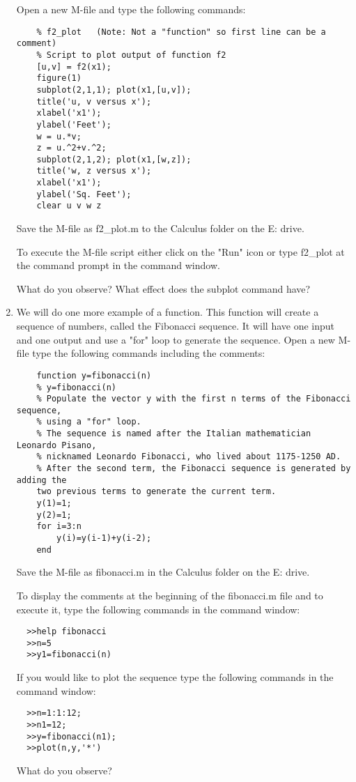 \begin{enumerate}
  Open a new M-file and type the following commands:
  \begin{verbatim}
    % f2_plot	(Note: Not a "function" so first line can be a comment)
    % Script to plot output of function f2    
    [u,v] = f2(x1);
    figure(1)
    subplot(2,1,1); plot(x1,[u,v]);
    title('u, v versus x');
    xlabel('x1');
    ylabel('Feet');
    w = u.*v;
    z = u.^2+v.^2;
    subplot(2,1,2); plot(x1,[w,z]);
    title('w, z versus x');
    xlabel('x1');
    ylabel('Sq. Feet');
    clear u v w z
  \end{verbatim}
  Save the M-file as f2\_plot.m to the Calculus folder on the E: drive.
  
  To execute the M-file script either click on the "Run" icon or type f2\_plot
  at the \ttt{>>} command prompt in the command window.
  
  What do you observe?  What effect does the subplot command have?
  \vspace{.25in}
  
  \item We will do one more example of a function.  This function will create a
  sequence of numbers, called the Fibonacci sequence.  It will have one input
  and one output and use a "for" loop to generate the sequence.
  \clearpage
  Open a new M-file type the following commands including the comments:
  \begin{verbatim}
    function y=fibonacci(n)
    % y=fibonacci(n)
    % Populate the vector y with the first n terms of the Fibonacci sequence,
    % using a "for" loop.
    % The sequence is named after the Italian mathematician Leonardo Pisano,
    % nicknamed Leonardo Fibonacci, who lived about 1175-1250 AD.
    % After the second term, the Fibonacci sequence is generated by adding the
    two previous terms to generate the current term.
    y(1)=1;
    y(2)=1;
    for i=3:n
        y(i)=y(i-1)+y(i-2);
    end
  \end{verbatim}
  Save the M-file as fibonacci.m in the Calculus folder on the E: drive.
  
  To display the comments at the beginning of the fibonacci.m file and to
  execute it, type the following commands in the command window:
  \begin{verbatim}
  >>help fibonacci
  >>n=5
  >>y1=fibonacci(n)
  \end{verbatim}
  
  If you would like to plot the sequence type the following commands in the
  command window:
  \begin{verbatim}
  >>n=1:1:12;
  >>n1=12;
  >>y=fibonacci(n1);
  >>plot(n,y,'*')
  \end{verbatim}
  What do you observe?
  
     
\end{enumerate}



